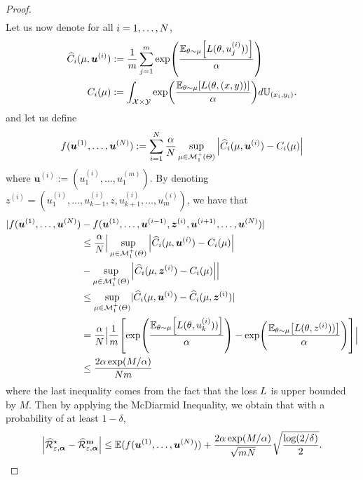 \begin{proof}
\begin{align*}
\end{align*}
Let us now denote for all $i=1,\dots,N$,
\begin{align*}
    \widehat{C}_i(\mu,\bm{u}^{(i)})&:=\frac1m \sum_{j=1}^{m}\exp\left(\frac{\mathbb{E}_{\theta \sim \mu}\left[\loss(\theta,u_j^{(i)}))\right]}{\alpha}\right)\\
    C_i(\mu)&:= \int_{\mathcal{X}\times\mathcal{Y}}\exp\left(\frac{\mathbb{E}_{\theta \sim \mu}\left[\loss(\theta,(x,y))\right]}{\alpha}\right) d\mathbb{U}_{(x_i,y_i)}.
\end{align*}
and let us define 
\begin{align*}
    f(\bm{u}^{(1)},\dots,\bm{u}^{(N)}):=\sum_{i=1}^N\frac{\alpha}{N}\sup_{\mu\in \mathcal{M}^+_1(\Theta)}\Big |\widehat{C}_i(\mu,\bm{u}^{(i)}) -C_i(\mu)\Big |
\end{align*}
where $\bm{u}^{(i)}:=(u_1^{(i)},\dots,u_1^{(m)})$. By denoting $z^{(i)}=(u_1^{(i)},\dots,u_{k-1}^{(i)},z,u_{k+1}^{(i)},\dots,u_m^{(i)})$, we have that
\begin{align*}
  |f(\bm{u}^{(1)},\dots,\bm{u}^{(\numsamples)})& - f(\bm{u}^{(1)},\dots,\bm{u}^{(i-1)},\bm{z}^{(i)},\bm{u}^{(i+1)},\dots,\bm{u}^{(\numsamples)})|\\
  &\leq \frac{\alpha}{\numsamples}\Big | \sup_{\mu\in \mathcal{M}^+_1(\Theta)}\Big |\widehat{C}_i(\mu,\bm{u}^{(i)}) -C_i(\mu)\Big |\\
 & - \sup_{\mu\in \mathcal{M}^+_1(\Theta)}\Big |\widehat{C}_i(\mu,\bm{z}^{(i)}) -C_i(\mu)\Big | \Big |\\
 &\leq\sup_{\mu\in \mathcal{M}^+_1(\Theta)} \lvert \widehat{C}_i(\mu,\bm{u}^{(i)}) -\widehat{C}_i(\mu,\bm{z}^{(i)}) \rvert\\
  &= \frac{\alpha}{\numsamples}\Big |\frac{1}{m}\left[\exp\left(\frac{\mathbb{E}_{\theta \sim \mu}\left[\loss(\theta,u_k^{(i)}))\right]}{\alpha}\right) - \exp\left(\frac{\mathbb{E}_{\theta \sim \mu}\left[\loss(\theta,z^{(i)}))\right]}{\alpha}\right) \right]\Big| \\
  &\leq \frac{2\alpha\exp(M/\alpha)}{\numsamples m}
\end{align*}
where the last inequality comes from the fact that the loss  $L$ is upper bounded by $M$. Then by applying the McDiarmid Inequality, we obtain that with a probability of at least $1-\delta$,
\begin{align*}
 \Big| \widehat{\mathcal{R}}^{\star}_{\varepsilon,\bm{\alpha}} - \widehat{\mathcal{R}}^{\textbf{m}}_{\varepsilon,\bm{\alpha}}\Big |\leq\mathbb{E}(f(\bm{u}^{(1)},\dots,\bm{u}^{(\numsamples)}))+\frac{2\alpha\exp(M/\alpha)}{\sqrt{m\numsamples}}\sqrt{\frac{\log(2/\delta)}{2}}.

\end{align*}
\end{proof}
